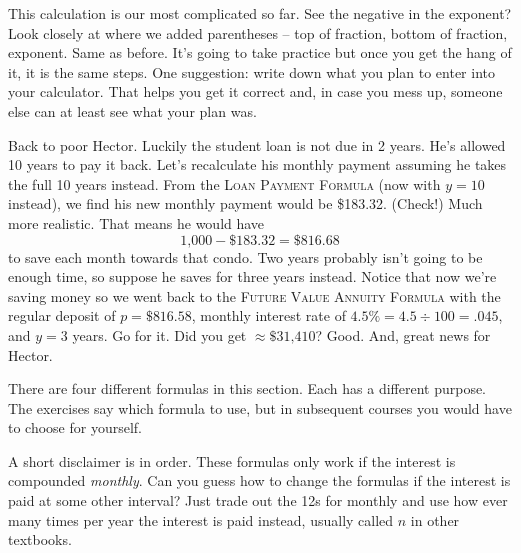 This calculation is our most complicated so far. See the negative in the exponent? Look closely at where we added parentheses -- top of fraction, bottom of fraction, exponent.  Same as before.  It's going to take practice but once you get the hang of it, it is the same steps.  One suggestion: write down what you plan to enter into your calculator.  That helps you get it correct and, in case you mess up, someone else can at least see what your plan was. 

Back to poor Hector. Luckily the student loan is not due in 2 years.  He's allowed 10 years to pay it back.  Let's recalculate his monthly payment assuming he takes the full 10 years instead. From the  \textsc{Loan Payment Formula} (now with $y=10$ instead), we find his new monthly payment would be \$183.32.  (Check!)
Much more realistic.  That means he would have $$\text{1,000} - \$183.32 = \$816.68$$ to save each month towards that condo.  Two years probably isn't going to be enough time, so suppose he saves for three years instead. Notice that now we're saving money so we went back to the \textsc{Future Value Annuity Formula} with the regular deposit of $p=\$816.58$, monthly interest rate of $4.5\% = 4.5 \div 100 = .045$, and $y=3$ years.  
Go for it.  Did you get $ \approx \$\text{31,410}$?  Good.  And, great news for Hector.

There are four different formulas in this section.  Each has a different purpose.  The exercises say which formula to use, but in subsequent courses you would have to choose for yourself.  

A short disclaimer is in order.  These formulas only work if the interest is compounded \emph{monthly}.  Can you guess how to change the formulas if the interest is paid at some other interval?  Just trade out the 12s for monthly and use how ever many times per year the interest is paid instead, usually called $n$ in other textbooks.


%